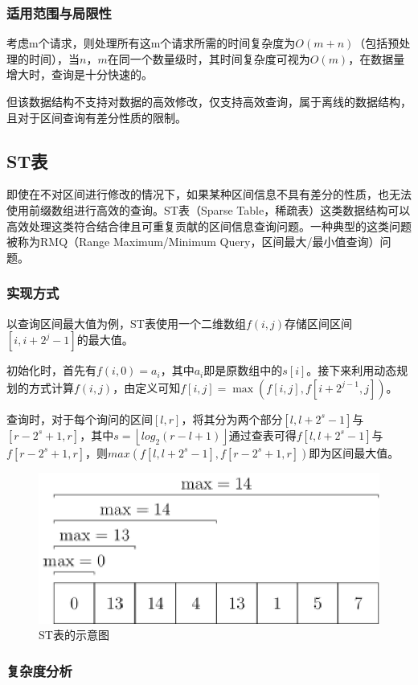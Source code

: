 \documentclass{cjc}
\begin{document}
\subsubsection{适用范围与局限性}
考虑m个请求，则处理所有这m个请求所需的时间复杂度为$O(m+n)$（包括预处理的时间），当$n$，$m$在同一个数量级时，其时间复杂度可视为$O(m)$，在数据量增大时，查询是十分快速的。

但该数据结构不支持对数据的高效修改，仅支持高效查询，属于离线的数据结构，且对于区间查询有差分性质的限制。

\subsection{ST表}
即使在不对区间进行修改的情况下，如果某种区间信息不具有差分的性质，也无法使用前缀数组进行高效的查询。ST表（Sparse Table，稀疏表）这类数据结构可以高效处理这类符合结合律且可重复贡献的区间信息查询问题。一种典型的这类问题被称为RMQ（Range Maximum/Minimum Query，区间最大/最小值查询）问题。
\subsubsection{实现方式}
以查询区间最大值为例，ST表使用一个二维数组$f(i,j)$存储区间区间$[i,i+2^j-1]$的最大值。

初始化时，首先有$f(i,0)=a_i$，其中$a_i$即是原数组中的$s[i]$。接下来利用动态规划的方式计算$f(i,j)$，由定义可知$f[i,j]=\max(f[i,j],f[i+2^{j-1},j])$。

查询时，对于每个询问的区间$[l,r]$，将其分为两个部分$[l,l+2^s-1]$与$[r-2^s+1,r]$，其中$s=\left \lfloor log_2 (r-l+1) \right \rfloor $通过查表可得$f[l,l+2^s-1]$与$f[r-2^s+1,r]$，则$max(f[l,l+2^s-1],f[r-2^s+1,r])$即为区间最大值。
\begin{figure}[htb]
  \centering
  \includegraphics[width=\linewidth]{images/st.eps}
  \caption{ST表的示意图}
\end{figure}
\subsubsection{复杂度分析} 
\end{document}
